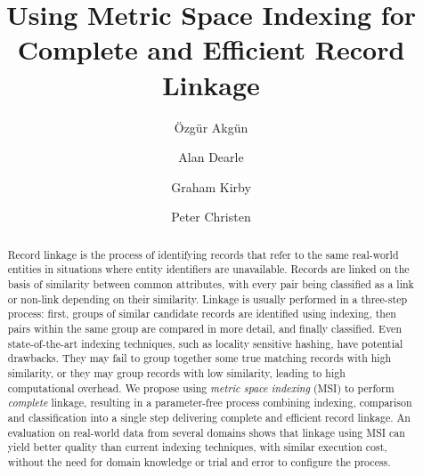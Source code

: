 \documentclass{llncs}
\begin{document}
       
\title{Using Metric Space Indexing for Complete and Efficient Record Linkage}


\author{{\"O}zg{\"u}r Akg{\"u}n \and Alan Dearle
  \and Graham Kirby \and Peter Christen}

      

\maketitle

\begin{abstract}

Record linkage is the process of identifying records that refer to the
same real-world entities in situations where entity identifiers are
unavailable. Records are linked on the basis of similarity between
common attributes, with every pair being classified as a link or
non-link depending on their similarity. Linkage is usually performed in
a three-step process: first, groups of similar candidate records are
identified using indexing, then pairs within the same group are compared
in more detail, and finally classified. Even state-of-the-art indexing
techniques, such as locality sensitive hashing, have potential
drawbacks. They may fail to group together some true matching records
with high similarity, or they may group records with low similarity,
leading to high computational overhead. We propose using \emph{metric
space indexing} (MSI) to perform \emph{complete} linkage, resulting in a
parameter-free process combining indexing, comparison and classification
into a single step delivering complete and efficient record linkage. An
evaluation on real-world data from several domains shows that linkage
using MSI can yield better quality than current indexing techniques,
with similar execution cost, without the need for domain knowledge or
trial and error to configure the process.

\end{abstract}
\end{document}
